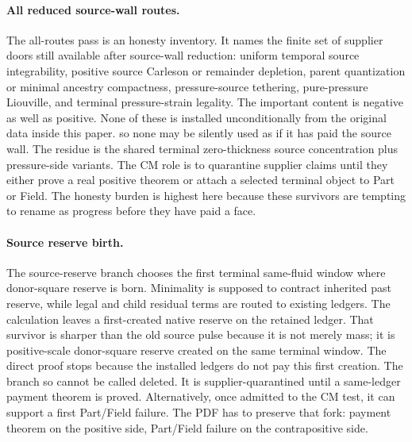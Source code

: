 \paragraph{All reduced source-wall routes.}
The all-routes pass is an honesty inventory.
It names the finite set of supplier doors still available after source-wall
reduction: uniform temporal source integrability, positive source Carleson or
remainder depletion, parent quantization or minimal ancestry compactness,
pressure-source tethering, pure-pressure Liouville, and terminal pressure-strain
legality.
The important content is negative as well as positive.
None of these is installed unconditionally from the original data inside this
paper.
so none may be silently used as if it has paid the source wall.
The residue is the shared terminal zero-thickness source concentration plus
pressure-side variants.
The CM role is to quarantine supplier claims until they either prove a real
positive theorem or attach a selected terminal object to Part or Field.
The honesty burden is highest here because these survivors are tempting to
rename as progress before they have paid a face.

\paragraph{Source reserve birth.}
The source-reserve branch chooses the first terminal same-fluid window where
donor-square reserve is born.
Minimality is supposed to contract inherited past reserve, while legal and
child residual terms are routed to existing ledgers.
The calculation leaves a first-created native reserve on the retained ledger.
That survivor is sharper than the old source pulse because it is not merely
mass; it is positive-scale donor-square reserve created on the same terminal
window.
The direct proof stops because the installed ledgers do not pay this first
creation.
The branch so cannot be called deleted.
It is supplier-quarantined until a same-ledger payment theorem is proved.
Alternatively, once admitted to the CM test, it can support a first Part/Field
failure.
The PDF has to preserve that fork: payment theorem on the positive side,
Part/Field failure on the contrapositive side.

